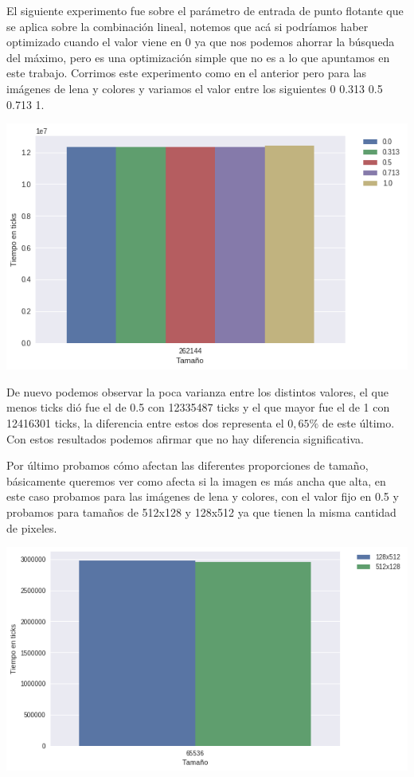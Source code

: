 El siguiente experimento fue sobre el parámetro de entrada de punto flotante que se aplica sobre la combinación lineal, notemos que acá si podríamos haber optimizado cuando el valor viene en 0 ya que nos podemos ahorrar la búsqueda del máximo, pero es una optimización simple que no es a lo que apuntamos en este trabajo. Corrimos este experimento como en el anterior pero para las imágenes de lena y colores y variamos el valor entre los siguientes 0 0.313 0.5 0.713 1.

\begin{center} 
	\includegraphics[scale=0.5]{img/maxCloser_PARAM_VAL.png}
\end{center}

De nuevo podemos observar la poca varianza entre los distintos valores, el que menos ticks dió fue el de 0.5 con 12335487 ticks y el que mayor fue el de 1 con 12416301 ticks, la diferencia entre estos dos representa el $0,65\%$ de este último. Con estos resultados podemos afirmar que no hay diferencia significativa.

Por último probamos cómo afectan las diferentes proporciones de tamaño, básicamente queremos ver como afecta si la imagen es más ancha que alta, en este caso probamos para las imágenes de lena y colores,  con el valor fijo en 0.5 y probamos para tamaños de 512x128 y 128x512 ya que tienen la misma cantidad de pixeles.

\begin{center} 
	\includegraphics[scale=0.5]{img/maxCloser_PARAM_SIZE.png}
\end{center}


